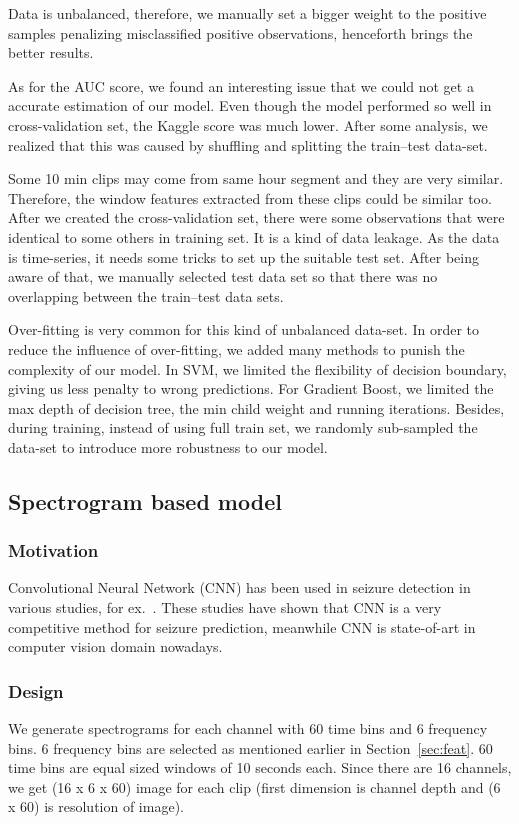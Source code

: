 \documentclass[letterpaper,12pt]{article}
\begin{document}
Data is unbalanced, therefore, we manually set a bigger weight to the positive
samples penalizing misclassified positive observations, henceforth brings the better
results.

As for the AUC score, we found an interesting issue that we could not get a
accurate estimation of our model. Even though the model performed so well in
cross-validation set, the Kaggle score was much lower. After some analysis, we
realized that this was caused by shuffling and splitting the train--test
data-set.

Some 10 min clips may come from same hour segment and they are very similar.
Therefore, the window features extracted from these clips could be similar too.
After we created the cross-validation set, there were some observations that
were identical to some others in training set. It is a kind of data leakage. As
the data is time-series, it needs some tricks to set up the suitable test set.
After being aware of that, we manually selected test data set so that there was
no overlapping between the train--test data sets.

Over-fitting is very common for this kind of unbalanced data-set. In order to
reduce the influence of over-fitting, we added many methods to punish the
complexity of our model. In SVM, we limited the flexibility of decision
boundary, giving us less penalty to wrong predictions. For Gradient Boost, we
limited the max depth of decision tree, the min child weight and running
iterations. Besides, during training, instead of using full train set, we
randomly sub-sampled the data-set to introduce more robustness to our model.

\subsection{Spectrogram based model}
\subsubsection{Motivation}
Convolutional Neural Network (CNN) has been used in seizure detection in various studies, for
ex.~\cite{mirowski2009classification,korshunova_faculty_2015}. These studies
have shown that CNN is a very competitive method for seizure prediction,
meanwhile CNN is state-of-art in computer vision domain nowadays.

\subsubsection{Design}
We generate spectrograms for each channel with 60 time bins and 6 frequency
bins. 6 frequency bins are selected  as mentioned earlier in
Section~\ref{sec:feat}. 60 time bins are equal sized windows of 10 seconds each.
Since there are 16 channels, we get (16 x 6 x 60) image for each clip (first
dimension is channel depth and (6 x 60) is resolution of image).
\end{document}
